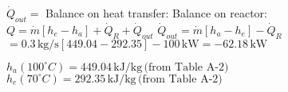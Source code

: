\( \dot{Q}_{out} = \)  
Balance on heat transfer:  
Balance on reactor:  
\( Q = \dot{m} \left[ h_e - h_a \right] + \dot{Q}_R + \dot{Q}_{out} \)  
\( \dot{Q}_{out} = \dot{m} \left[ h_a - h_e \right] - \dot{Q}_R \)  
\( = 0.3 \, \text{kg/s} \left[ 449.04 - 292.35 \right] - 100 \, \text{kW} = -62.18 \, \text{kW} \)  

\( h_a (100^\circ C) = 449.04 \, \text{kJ/kg} \, \text{(from Table A-2)} \)  
\( h_e (70^\circ C) = 292.35 \, \text{kJ/kg} \, \text{(from Table A-2)} \)